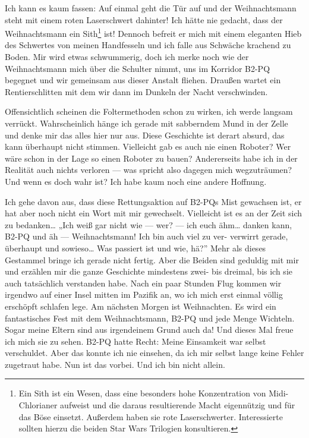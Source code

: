 Ich kann es kaum fassen: Auf einmal geht die Tür auf und der Weihnachtsmann steht mit einem roten Laserschwert dahinter! Ich hätte nie gedacht, dass der Weihnachtsmann ein Sith\footnote{Ein Sith ist ein Wesen, dass eine besonders hohe Konzentration von Midi-Chlorianer aufweist und die daraus resultierende Macht eigennützig und für das Böse einsetzt. Außerdem haben sie rote Laserschwerter. Interessierte sollten hierzu die beiden Star Wars Trilogien konsultieren.} ist! Dennoch befreit er mich mit einem eleganten Hieb des Schwertes von meinen Handfesseln und ich falle aus Schwäche krachend zu Boden. Mir wird etwas schwummerig, doch ich merke noch wie der Weihnachtsmann mich über die Schulter nimmt, uns im Korridor B2-PQ begegnet und wir gemeinsam aus dieser Anstalt fliehen. Draußen wartet ein Rentierschlitten mit dem wir dann im Dunkeln der Nacht verschwinden.

Offensichtlich scheinen die Foltermethoden schon zu wirken, ich werde langsam verrückt. Wahrscheinlich hänge ich gerade mit sabberndem Mund in der Zelle und denke mir das alles hier nur aus. Diese Geschichte ist derart absurd, das kann überhaupt nicht stimmen. Vielleicht gab es auch nie einen Roboter? Wer wäre schon in der Lage so einen Roboter zu bauen? Andererseits habe ich in der Realität auch nichts verloren — was spricht also dagegen mich wegzuträumen? Und wenn es doch wahr ist? Ich habe kaum noch eine andere Hoffnung.

Ich gehe davon aus, dass diese Rettungsaktion auf B2-PQs Mist gewachsen ist, er hat aber noch nicht ein Wort mit mir gewechselt. Vielleicht ist es an der Zeit sich zu bedanken… „Ich weiß gar nicht wie — wer? — ich euch ähm… danken kann, B2-PQ und äh — Weihnachtsmann! Ich bin auch viel zu ver- verwirrt gerade, überhaupt und sowieso… Was passiert ist und wie, hä?” Mehr als dieses Gestammel bringe ich gerade nicht fertig. Aber die Beiden sind geduldig mit mir und erzählen mir die ganze Geschichte mindestens zwei- bis dreimal, bis ich sie auch tatsächlich verstanden habe. Nach ein paar Stunden Flug kommen wir irgendwo auf einer Insel mitten im Pazifik an, wo ich mich erst einmal völlig erschöpft schlafen lege.
Am nächsten Morgen ist Weihnachten. Es wird ein fantastisches Fest mit dem Weihnachtsmann, B2-PQ und jede Menge Wichteln. Sogar meine Eltern sind aus irgendeinem Grund auch da! Und dieses Mal freue ich mich sie zu sehen. B2-PQ hatte Recht: Meine Einsamkeit war selbst verschuldet. Aber das konnte ich nie einsehen, da ich mir selbst lange keine Fehler zugetraut habe. Nun ist das vorbei. Und ich bin nicht allein.